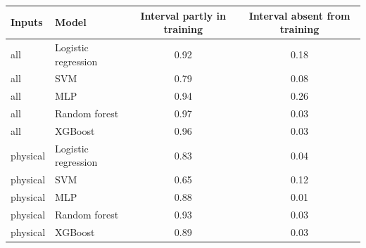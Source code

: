 \begin{tabular}{llcc}
\toprule
Inputs & Model & Interval partly in training & Interval absent from training \\
\midrule
all & Logistic regression & 0.92 & 0.18 \\
all & SVM & 0.79 & 0.08 \\
all & MLP & 0.94 & 0.26 \\
all & Random forest & 0.97 & 0.03 \\
all & XGBoost & 0.96 & 0.03 \\
physical & Logistic regression & 0.83 & 0.04 \\
physical & SVM & 0.65 & 0.12 \\
physical & MLP & 0.88 & 0.01 \\
physical & Random forest & 0.93 & 0.03 \\
physical & XGBoost & 0.89 & 0.03 \\
\bottomrule
\end{tabular}
